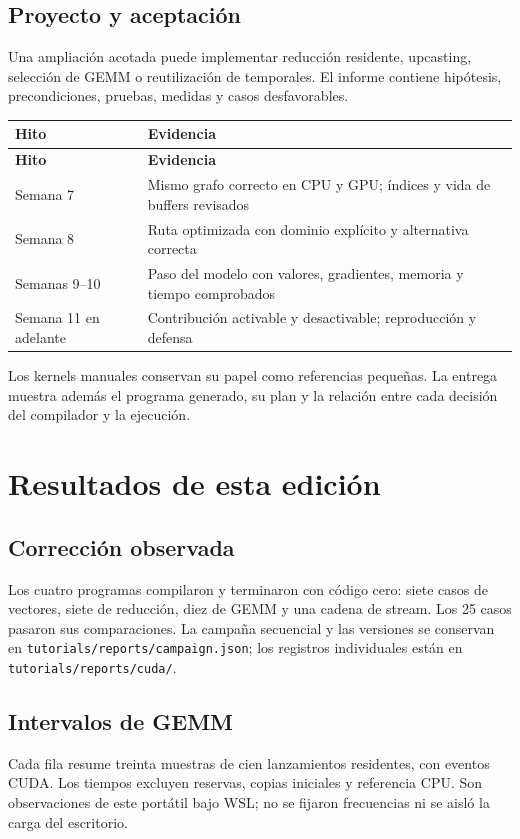 \documentclass[12pt,a4paper,oneside]{report}
\begin{document}
\section{Proyecto y aceptación}
Una ampliación acotada puede implementar reducción residente, upcasting, selección de GEMM o reutilización de temporales. El informe contiene hipótesis, precondiciones, pruebas, medidas y casos desfavorables.

{\small
\begin{longtable}{@{}P{0.3\textwidth}P{0.65\textwidth}@{}}
\toprule
\textbf{Hito} & \textbf{Evidencia}\\
\midrule
\endfirsthead
\toprule
\textbf{Hito} & \textbf{Evidencia}\\
\midrule
\endhead
Semana 7 & Mismo grafo correcto en CPU y GPU; índices y vida de buffers revisados\\
Semana 8 & Ruta optimizada con dominio explícito y alternativa correcta\\
Semanas 9--10 & Paso del modelo con valores, gradientes, memoria y tiempo comprobados\\
Semana 11 en adelante & Contribución activable y desactivable; reproducción y defensa\\
\bottomrule
\end{longtable}
}
Los kernels manuales conservan su papel como referencias pequeñas. La entrega muestra además el programa generado, su plan y la relación entre cada decisión del compilador y la ejecución.

\chapter{Resultados de esta edición}
\section{Corrección observada}
Los cuatro programas compilaron y terminaron con código cero: siete casos de vectores, siete de reducción, diez de GEMM y una cadena de stream. Los 25 casos pasaron sus comparaciones. La campaña secuencial y las versiones se conservan en \texttt{tutorials/re\allowbreak{}ports/campai\allowbreak{}gn.json}; los registros individuales están en \texttt{tutorials/re\allowbreak{}ports/cuda/}.

\section{Intervalos de GEMM}
Cada fila resume treinta muestras de cien lanzamientos residentes, con eventos CUDA. Los tiempos excluyen reservas, copias iniciales y referencia CPU. Son observaciones de este portátil bajo WSL; no se fijaron frecuencias ni se aisló la carga del escritorio.
\end{document}
